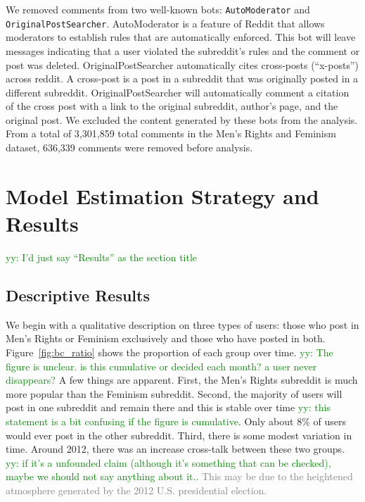 \documentclass[letterpaper]{article}
\newcommand{\yy}[1]{{\textcolor{green}{yy: #1}}}
\newcommand{\del}[1]{{\textcolor{gray}{#1}}}
\begin{document}
We removed comments from two well-known bots: \texttt{AutoModerator} and \texttt{OriginalPostSearcher}. AutoModerator is a feature of Reddit that allows moderators to establish rules that are automatically enforced. This bot will leave messages indicating that a user violated the subreddit's rules and the comment or post was deleted. OriginalPostSearcher automatically cites cross-posts (``x-posts'') across reddit. A cross-post is a post in a subreddit that was originally posted in a different subreddit. OriginalPostSearcher will automatically comment a citation of the cross post with a link to the original subreddit, author's page, and the original post. We excluded the content generated by these bots from the analysis. From a total of 3,301,859 total comments in the Men's Rights and Feminism dataset, 636,339 comments  were removed before analysis. %

\section{Model Estimation Strategy and Results}
\yy{I'd just say ``Results'' as the section title}

\subsection{Descriptive Results}

We begin with a qualitative description on three types of users: those who post in Men's Rights or Feminism exclusively and those who have posted in both. Figure~\ref{fig:bc_ratio} shows the proportion of each group over time. \yy{The figure is unclear. is this cumulative or decided each month? a user never disappears?} A few things are apparent. First, the Men's Rights subreddit is much more popular than the Feminism subreddit. Second, the majority of users will post in one subreddit and remain there and this is stable over time \yy{this statement is a bit confusing if the figure is cumulative}. Only about 8\% of users would ever post in the other subreddit. Third, there is some modest variation in time. Around 2012, there was an increase cross-talk between these two groups. \yy{if it's a unfounded claim (although it's something that can be checked), maybe we should not say anything about it..} \del{This may be due to the heightened atmosphere generated by the 2012 U.S. presidential election.}
\end{document}
